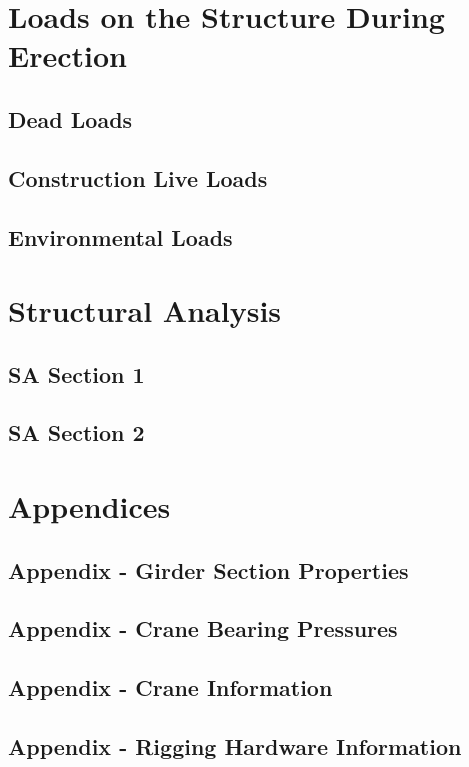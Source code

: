 \documentclass[11pt,letterpaper]{report}
\begin{document}
\setcounter{page}{1}
\renewcommand{\thepage}{\arabic{chapter}-\arabic{page}}
\chapter{Loads on the Structure During Erection}
\section{Dead Loads}
\section{Construction Live Loads}
\section{Environmental Loads}
 
 
 
 

\setcounter{page}{1}
\renewcommand{\thepage}{\arabic{chapter}-\arabic{page}}
\chapter{Structural Analysis}
\section{SA Section 1}
\section{SA Section 2}



\setcounter{chapter}{0}
\setcounter{page}{1}
\setcounter{secnumdepth}{1}
\renewcommand{\thepage}{ }
\renewcommand{\thesection}{}

\chapter{Appendices}
\setcounter{page}{1}
\renewcommand{\thepage}{\Alph{section}-\arabic{page}}
\section{Appendix  - Girder Section Properties}

\setcounter{page}{1}
\renewcommand{\thepage}{\Alph{section}-\arabic{page}}
\section{Appendix  - Crane Bearing Pressures}

\setcounter{page}{1}
\renewcommand{\thepage}{\Alph{section}-\arabic{page}}
\section{Appendix  - Crane Information}

\setcounter{page}{1}
\renewcommand{\thepage}{\Alph{section}-\arabic{page}}
\section{Appendix  - Rigging Hardware Information}
\end{document}
